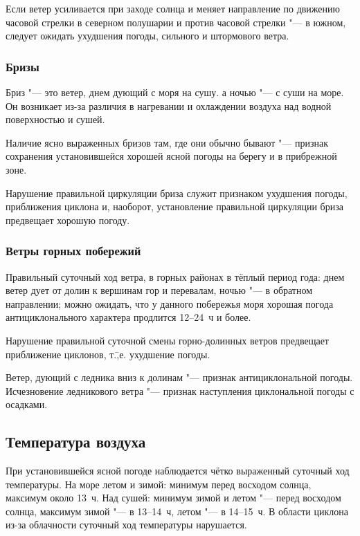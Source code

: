  Если ветер усиливается при заходе солнца и меняет направление
по движению часовой стрелки в северном полушарии и против часовой
стрелки "--- в южном, следует ожидать ухудшения погоды, сильного и
штормового ветра.

\subsubsection{Бризы}

Бриз "--- это ветер, днем дующий с моря на сушу. а ночью "--- с суши на
море. Он возникает из-за различия в нагревании и охлаждении воздуха
над водной поверхностью и сушей.

 Наличие ясно выраженных бризов там, где они обычно бывают "---
признак сохранения установившейся хорошей ясной погоды на берегу и в
прибрежной зоне.

 Нарушение правильной циркуляции бриза служит признаком
ухудшения погоды, приближения циклона и, наоборот, установление
правильной циркуляции бриза предвещает хорошую погоду.

\subsubsection{Ветры горных побережий}

 Правильный суточный ход ветра, в горных районах в тёплый
период года: днем ветер дует от долин к вершинам гор и перевалам,
ночью "--- в обратном направлении; можно ожидать, что у данного побережья
моря хорошая погода антициклонального характера продлится 12--24~ч и
более.

 Нарушение правильной суточной смены горно-долинных ветров
предвещает приближение циклонов, т.\=,е. ухудшение погоды.

 Ветер, дующий с ледника вниз к долинам "--- признак антициклональной
погоды. Исчезновение ледникового ветра "--- признак наступления
циклональной погоды с осадками.

\subsection{Температура воздуха}

При установившейся ясной погоде наблюдается чётко выраженный суточный
ход температуры. На море летом и зимой: минимум перед восходом солнца,
максимум около 13~ч. Над сушей: минимум зимой и летом "--- перед восходом
солнца, максимум зимой "--- в 13--14~ч, летом "--- в 14--15~ч. В области
циклона из-за облачности суточный ход температуры нарушается.

